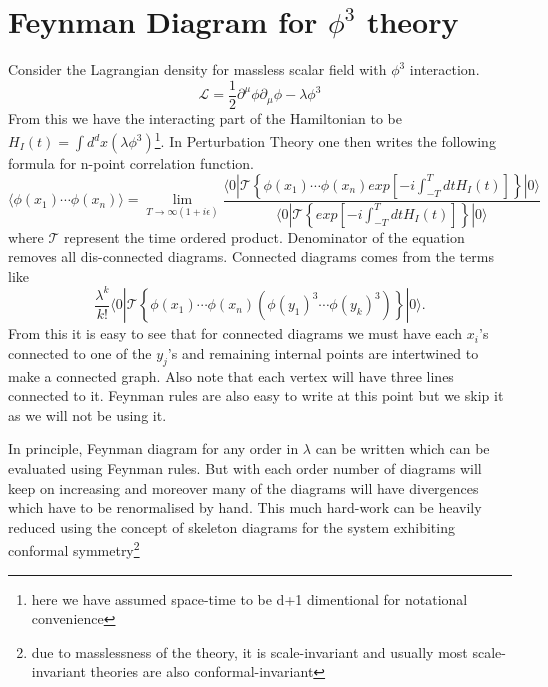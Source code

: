 \documentclass[12pt,a4paper,oneside]{book}
\theoremstyle{definition}
\begin{document}
    \section{Feynman Diagram for $\phi^3$ theory}
        Consider the Lagrangian density for massless scalar field with $\phi^3$ interaction.
        \begin{equation}
            \mathcal{L} = \frac{1}{2}\partial^{\mu}\phi\partial_{\mu}\phi - \lambda\phi^3
        \end{equation}
        From this we have the interacting part of the Hamiltonian to be $H_{I}(t) = \int d^dx(\lambda\phi^3) $\footnote{here we have assumed space-time to be d+1 dimentional for notational convenience}. In Perturbation Theory one then writes the following formula for n-point correlation function.
        \begin{equation}
            \langle\phi(x_1)\cdots\phi(x_n)\rangle = \lim_{T\to\infty(1+i\epsilon) } \frac{\langle0|\mathcal{T}\left\{\phi(x_1)\cdots\phi(x_n)exp\left[-i\int_{-T}^TdtH_I(t)\right] \right\}|0\rangle}{\langle0|\mathcal{T}\left\{exp\left[-i\int_{-T}^TdtH_I(t)\right] \right\}|0\rangle}
        \end{equation} 
    where $\mathcal{T}$ represent the time ordered product. Denominator of the equation removes all dis-connected diagrams. Connected diagrams comes from the terms like \begin{equation}\frac{\lambda^k}{k!}\langle0|\mathcal{T}\left\{\phi(x_1)\cdots\phi(x_n) (\phi(y_1)^3\cdots\phi(y_k)^3)\right\}|0\rangle.\end{equation} From this it is easy to see that for connected diagrams we must have each $x_i$'s connected to one of the $y_j$'s and remaining internal points are intertwined to make a connected graph. Also note that each vertex will have three lines connected to it. Feynman rules are also easy to write at this point but we skip it as we will not be using it.\par
        In principle, Feynman diagram for any order in $\lambda$ can be written which can be evaluated using Feynman rules. But with each order number of diagrams will keep on increasing and moreover many of the diagrams will have divergences which have to be renormalised by hand. This much hard-work can be heavily reduced using the concept of skeleton diagrams for the system exhibiting conformal symmetry\footnote{due to masslessness of the theory, it is scale-invariant and usually most scale-invariant theories are also conformal-invariant }  
\end{document}
